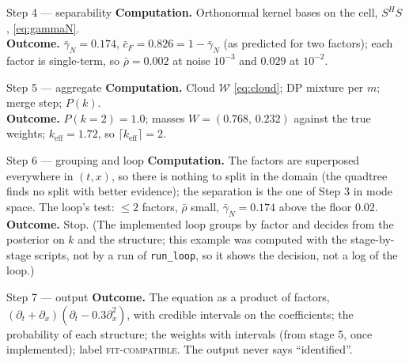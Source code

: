 \begin{wstep}{Step 4 --- separability}
\textbf{Computation.} Orthonormal kernel bases on the cell, $S^HS$, \eqref{eq:gammaN}.\\
\textbf{Outcome.} $\bar\gamma_N=0.174$, $\bar c_F=0.826=1-\bar\gamma_N$ (as predicted for two factors); each factor is single-term, so $\bar\rho=0.002$ at noise $10^{-3}$ and $0.029$ at $10^{-2}$.
\end{wstep}

\begin{wstep}{Step 5 --- aggregate}
\textbf{Computation.} Cloud $\mathcal W$ \eqref{eq:cloud}; DP mixture per $m$; merge step; $P(k)$.\\
\textbf{Outcome.} $P(k=2)=1.0$; masses $W=(0.768,\,0.232)$ against the true weights; $k_{\mathrm{eff}}=1.72$, so $\lceil k_{\mathrm{eff}}\rceil=2$.
\end{wstep}

\begin{wstep}{Step 6 --- grouping and loop}
\textbf{Computation.} The factors are superposed everywhere in $(t,x)$, so there is nothing to split in the domain (the quadtree finds no split with better evidence); the separation is the one of Step 3 in mode space. The loop's test: $\le2$ factors, $\bar\rho$ small, $\bar\gamma_N=0.174$ above the floor $0.02$.\\
\textbf{Outcome.} Stop. (The implemented loop groups by factor and decides from the posterior on $k$ and the structure; this example was computed with the stage-by-stage scripts, not by a run of \texttt{run\_loop}, so it shows the decision, not a log of the loop.)
\end{wstep}

\begin{wstep}{Step 7 --- output}
\textbf{Outcome.} The equation as a product of factors, $(\partial_t+\partial_x)(\partial_t-0.3\partial_x^2)$, with credible intervals on the coefficients; the probability of each structure; the weights with intervals (from stage 5, once implemented); label \textsc{fit-compatible}. The output never says ``identified''.
\end{wstep}
